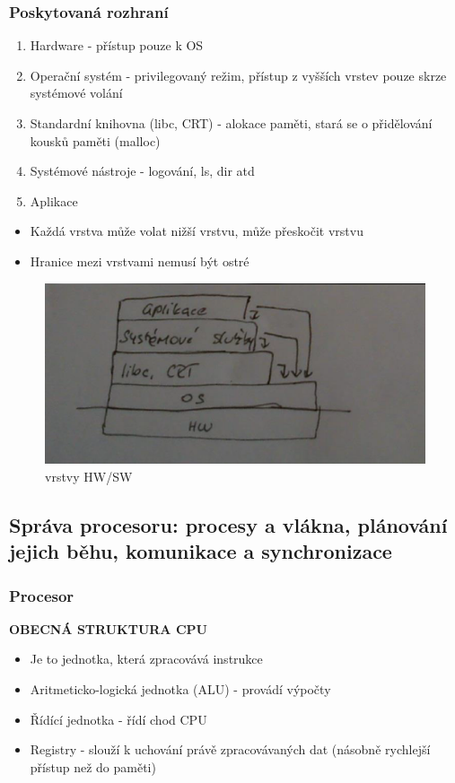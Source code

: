 \documentclass[10pt,a4paper]{article}
\begin{document}
\subsubsection{Poskytovaná rozhraní}
\begin{enumerate}
	\item Hardware - přístup pouze k OS
	\item Operační systém - privilegovaný režim, přístup z vyšších vrstev pouze skrze systémové volání
	\item Standardní knihovna (libc, CRT) - alokace paměti, stará se o přidělování kousků paměti (malloc)
	\item Systémové nástroje - logování, ls, dir atd
	\item Aplikace
\end{enumerate}
\begin{itemize}
	\item Každá vrstva může volat nižší vrstvu, může přeskočit vrstvu
	\item Hranice mezi vrstvami nemusí být ostré
\end{itemize}

\begin{figure} [h]
		\includegraphics[scale=1]{img/vrstvy_HW-SW.png}
		\caption{vrstvy HW/SW}	
\end{figure}

\subsection{Správa procesoru: procesy a vlákna, plánování jejich běhu, komunikace a synchronizace}

\subsubsection{Procesor}
\textbf{OBECNÁ STRUKTURA CPU}
\begin{itemize}
	\item Je to jednotka, která zpracovává instrukce
	\item Aritmeticko-logická jednotka (ALU) - provádí výpočty
	\item Řídící jednotka - řídí chod CPU
	\item Registry - slouží k uchování právě zpracovávaných dat (násobně rychlejší přístup než do paměti)
\end{itemize}
\end{document}
